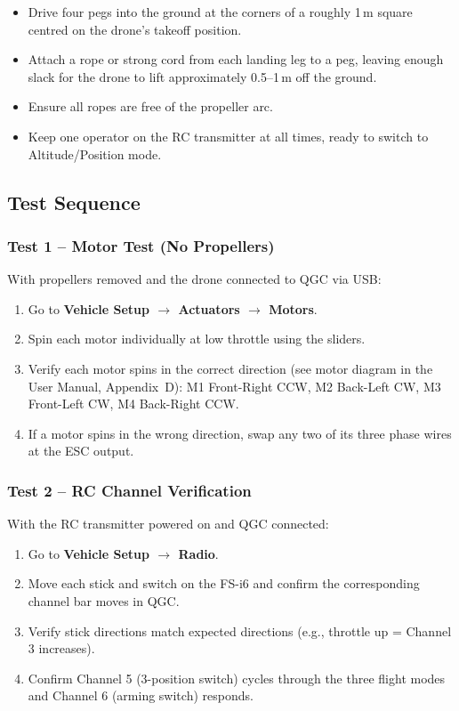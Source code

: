 \documentclass{article}
\begin{document}
\begin{itemize}
    \item Drive four pegs into the ground at the corners of a roughly 1\,m square centred on the drone's takeoff position.
    \item Attach a rope or strong cord from each landing leg to a peg, leaving enough slack for the drone to lift approximately 0.5--1\,m off the ground.
    \item Ensure all ropes are free of the propeller arc.
    \item Keep one operator on the RC transmitter at all times, ready to switch to Altitude/Position mode.
\end{itemize}

\subsection{Test Sequence}
\label{sec:testseq}

\subsubsection{Test 1 -- Motor Test (No Propellers)}
\label{sec:motortest}

With propellers removed and the drone connected to QGC via USB:

\begin{enumerate}
    \item Go to \textbf{Vehicle Setup $\rightarrow$ Actuators $\rightarrow$ Motors}.
    \item Spin each motor individually at low throttle using the sliders.
    \item Verify each motor spins in the correct direction (see motor diagram in the User Manual, Appendix~D): M1 Front-Right CCW, M2 Back-Left CW, M3 Front-Left CW, M4 Back-Right CCW.
    \item If a motor spins in the wrong direction, swap any two of its three phase wires at the ESC output.
\end{enumerate}

\subsubsection{Test 2 -- RC Channel Verification}

With the RC transmitter powered on and QGC connected:

\begin{enumerate}
    \item Go to \textbf{Vehicle Setup $\rightarrow$ Radio}.
    \item Move each stick and switch on the FS-i6 and confirm the corresponding channel bar moves in QGC.
    \item Verify stick directions match expected directions (e.g., throttle up = Channel 3 increases).
    \item Confirm Channel 5 (3-position switch) cycles through the three flight modes and Channel 6 (arming switch) responds.
\end{enumerate}
\end{document}
